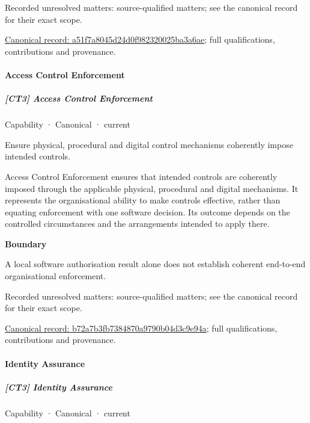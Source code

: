 {\small Recorded unresolved matters: source-qualified matters; see the canonical record for their exact scope.}\par
{\footnotesize \href{../../../../continuum/strategy/capability/a51f7a8045d24d0f982320025ba3a6ae.md}{Canonical record: a51f7a8045d24d0f982320025ba3a6ae}; full qualifications, contributions and provenance.}\par
\paragraph{Access Control Enforcement}

\subparagraph{[CT3] Access Control Enforcement}

\label{element:b72a7b3fb7384870a9790b04d3c9e94a}
{\small Capability · Canonical · current}\par

Ensure physical, procedural and digital control mechanisms coherently impose intended controls.



Access Control Enforcement ensures that intended controls are coherently imposed through the applicable physical, procedural and digital mechanisms. It represents the organisational ability to make controls effective, rather than equating enforcement with one software decision. Its outcome depends on the controlled circumstances and the arrangements intended to apply there.



\textbf{Boundary}



A local software authorisation result alone does not establish coherent end-to-end organisational enforcement.


{\small Recorded unresolved matters: source-qualified matters; see the canonical record for their exact scope.}\par
{\footnotesize \href{../../../../continuum/strategy/capability/b72a7b3fb7384870a9790b04d3c9e94a.md}{Canonical record: b72a7b3fb7384870a9790b04d3c9e94a}; full qualifications, contributions and provenance.}\par
\paragraph{Identity Assurance}

\subparagraph{[CT3] Identity Assurance}

\label{element:56ccd6d3bf5b4ec980a333dfadf8d9fa}
{\small Capability · Canonical · current}\par

